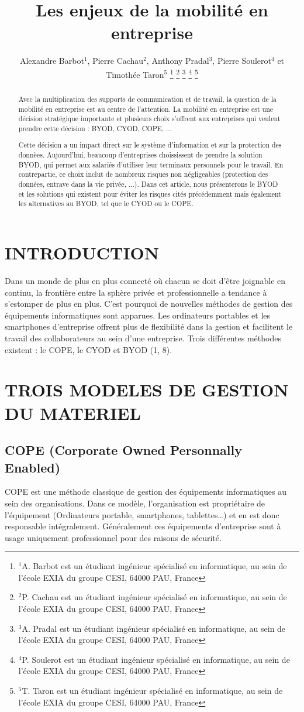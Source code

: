 \documentclass[letterpaper, 11 pt, conference]{ieeeconf}
\title{\LARGE \bf
Les enjeux de la mobilit\'{e} en entreprise
}
\author{Alexandre Barbot$^{1}$, Pierre Cachau$^{2}$, Anthony Pradal$^{3}$, Pierre Soulerot$^{4}$ et Timoth\'{e}e Taron$^{5}$%
\thanks{$^{1}$A. Barbot est un \'{e}tudiant ing\'{e}nieur sp\'{e}cialis\'{e} en informatique, au sein de l'\'{e}cole EXIA du groupe CESI, 64000 PAU, France
	}%
\thanks{$^{2}$P. Cachau est un \'{e}tudiant ing\'{e}nieur sp\'{e}cialis\'{e} en informatique, au sein de l'\'{e}cole EXIA du groupe CESI, 64000 PAU, France
	}%
\thanks{$^{3}$A. Pradal est un \'{e}tudiant ing\'{e}nieur sp\'{e}cialis\'{e} en informatique, au sein de l'\'{e}cole EXIA du groupe CESI, 64000 PAU, France
	}%
\thanks{$^{4}$P. Soulerot est un \'{e}tudiant ing\'{e}nieur sp\'{e}cialis\'{e} en informatique, au sein de l'\'{e}cole EXIA du groupe CESI, 64000 PAU, France
	}%
\thanks{$^{5}$T. Taron est un \'{e}tudiant ing\'{e}nieur sp\'{e}cialis\'{e} en informatique, au sein de l'\'{e}cole EXIA du groupe CESI, 64000 PAU, France
	}%
}
\begin{document}
\maketitle
\thispagestyle{empty}
\pagestyle{empty}

%

\begin{abstract}
Avec la multiplication des supports de communication et de travail, la question de la mobilit\'{e} en entreprise est au centre de l'attention.
La mobilit\'{e} en entreprise est une d\'{e}cision strat\'{e}gique importante et plusieurs choix s'offrent aux entreprises qui veulent prendre cette d\'{e}cision :
BYOD, CYOD, COPE, ...

Cette d\'{e}cision a un impact direct sur le syst\`{e}me d'information et sur la protection des donn\`{e}es. Aujourd'hui, beaucoup d'entreprises choississent de prendre
la solution BYOD, qui permet aux salari\'{e}s d'utiliser leur terminaux personnels pour le travail. En contrepartie, ce choix inclut de nombreux risques 
non n\'{e}gligeables (protection des donn\'{e}es, entrave dans la vie priv\'{e}e, ...). Dans cet article, nous pr\'{e}senterons le BYOD et les solutions 
qui existent pour \'{e}viter les risques cit\'{e}s pr\'{e}c\'{e}demment mais \'{e}galement les alternatives au BYOD, tel que le CYOD ou le COPE.

\end{abstract}

\section{INTRODUCTION}
Dans un monde de plus en plus connect\'{e} o\`{u} chacun se doit d’\^{e}tre joignable en continu, la fronti\`{e}re entre la sph\`{e}re priv\'{e}e et professionnelle a tendance \`{a} s'estomper de plus en plus. C'est pourquoi de nouvelles m\'{e}thodes de gestion des \'{e}quipements informatiques sont apparues. Les ordinateurs portables et les smartphones d'entreprise offrent plus de flexibilit\'{e} dans la gestion et facilitent le travail des collaborateurs au sein d'une entreprise. Trois diff\'{e}rentes m\'{e}thodes existent : le COPE, le CYOD et BYOD (1, 8). 
\linebreak

\section{TROIS MODELES DE GESTION DU MATERIEL}
\subsection{COPE (Corporate Owned Personnally Enabled)}
COPE est une m\'{e}thode classique de gestion des \'{e}quipements informatiques au sein des organisations. Dans ce mod\`{e}le, l'organisation est propri\'{e}taire de l'\'{e}quipement (Ordinateurs portable, smartphones, tablettes…) et en est donc responsable int\'{e}gralement. G\'{e}n\'{e}ralement ces \'{e}quipements d'entreprise sont \`{a} usage uniquement professionnel pour des raisons de s\'{e}curit\'{e}. 
\end{document}
